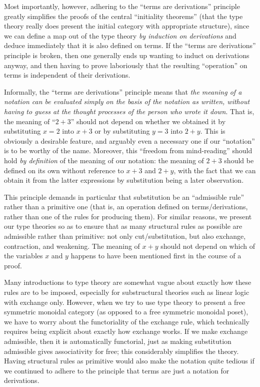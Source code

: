 Most importantly, however, adhering to the ``terms are derivations'' principle greatly simplifies the proofs of the central ``initiality theorems'' (that the type theory really does present the initial category with appropriate structure), since we can define a map out of the type theory \emph{by induction on derivations} and deduce immediately that it is also defined on terms.
If the ``terms are derivations'' principle is broken, then one generally ends up wanting to induct on derivations anyway, and then having to prove laboriously that the resulting ``operation'' on terms is independent of their derivations.

Informally, the ``terms are derivations'' principle means that \emph{the meaning of a notation can be evaluated simply on the basis of the notation as written, without having to guess at the thought processes of the person who wrote it down}.
That is, the meaning of ``$2+3$'' should not depend on whether we obtained it by substituting $x=2$ into $x+3$ or by substituting $y=3$ into $2+y$.
This is obviously a desirable feature, and arguably even a necessary one if our ``notation'' is to be worthy of the name.
Moreover, this ``freedom from mind-reading'' should hold \emph{by definition} of the meaning of our notation: the meaning of $2+3$ should be defined on its own without reference to $x+3$ and $2+y$, with the fact that we can obtain it from the latter expressions by substitution being a later observation.

This principle demands in particular that substitution be an ``admissible rule'' rather than a primitive one (that is, an operation defined on terms/derivations, rather than one of the rules for producing them).
For similar reasons, we present our type theories so as to ensure that as many structural rules as possible are admissible rather than primitive: not only cut/substitution, but also exchange, contraction, and weakening.
The meaning of $x+y$ should not depend on which of the variables $x$ and $y$ happens to have been mentioned first in the course of a proof.

Many introductions to type theory are somewhat vague about exactly how these rules are to be imposed, especially for substructural theories such as linear logic with exchange only.
However, when we try to use type theory to present a free symmetric monoidal category (as opposed to a free symmetric monoidal poset), we have to worry about the functoriality of the exchange rule, which technically requires being explicit about exactly how exchange works.
If we make exchange admissible, then it is automatically functorial, just as making substitution admissible gives associativity for free; this considerably simplifies the theory.
Having structural rules as primitive would also make the notation quite tedious if we continued to adhere to the principle that terms are just a notation for derivations.

